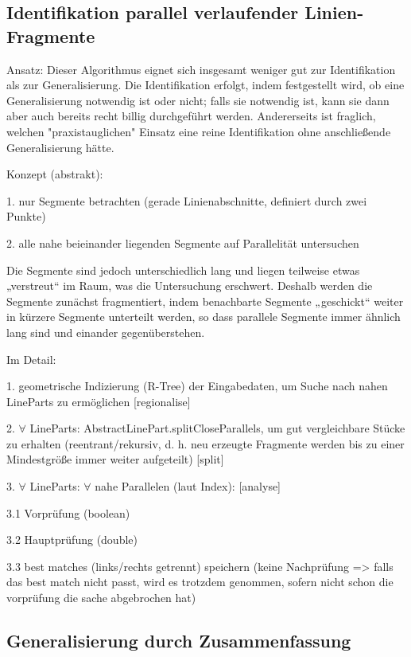 \documentclass[../main/thesis.tex]{subfiles}
\begin{document}
\subsection{Identifikation parallel verlaufender Linien-Fragmente}

Ansatz: Dieser Algorithmus eignet sich insgesamt weniger gut zur Identifikation als zur Generalisierung.
Die Identifikation erfolgt, indem festgestellt wird, ob eine Generalisierung notwendig ist oder nicht; falls sie notwendig ist, kann sie dann aber auch bereits recht billig durchgeführt werden.
Andererseits ist fraglich, welchen "praxistauglichen" Einsatz eine reine Identifikation ohne anschließende Generalisierung hätte.

Konzept (abstrakt):

1. nur Segmente betrachten (gerade Linienabschnitte, definiert durch zwei Punkte)

2. alle nahe beieinander liegenden Segmente auf Parallelität untersuchen

Die Segmente sind jedoch unterschiedlich lang und liegen teilweise etwas „verstreut“ im Raum, was die Untersuchung erschwert.
Deshalb werden die Segmente zunächst fragmentiert, indem benachbarte Segmente „geschickt“ weiter in kürzere Segmente unterteilt werden, so dass parallele Segmente immer ähnlich lang sind und einander gegenüberstehen.

Im Detail:

1. geometrische Indizierung (R-Tree) der Eingabedaten, um Suche nach nahen LineParts zu ermöglichen [regionalise]

2. $\forall$ LineParts: AbstractLinePart.splitCloseParallels, um gut vergleichbare Stücke zu erhalten (reentrant/rekursiv, d. h. neu erzeugte Fragmente werden bis zu einer Mindestgröße immer weiter aufgeteilt) [split]

3. $\forall$ LineParts: $\forall$ nahe Parallelen (laut Index): [analyse]

3.1 Vorprüfung (boolean)

3.2 Hauptprüfung (double)

3.3 best matches (links/rechts getrennt) speichern (keine Nachprüfung => falls das best match nicht passt, wird es trotzdem genommen, sofern nicht schon die vorprüfung die sache abgebrochen hat)



\subsection{Generalisierung durch Zusammenfassung}
\end{document}
